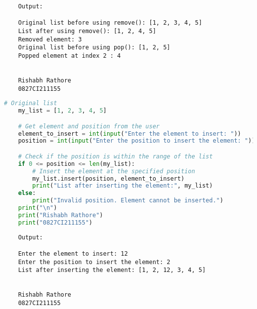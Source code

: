 \documentclass{report}
\begin{document}
\begin{verbatim}
	Output:

	Original list before using remove(): [1, 2, 3, 4, 5]
	List after using remove(): [1, 2, 4, 5]
	Removed element: 3
	Original list before using pop(): [1, 2, 5]
	Popped element at index 2 : 4
	
	
	Rishabh Rathore
	0827CI211155
\end{verbatim}
\newpage


\sol{}
\begin{lstlisting}[language=Python]
	# Original list
	my_list = [1, 2, 3, 4, 5]

	# Get element and position from the user
	element_to_insert = int(input("Enter the element to insert: "))
	position = int(input("Enter the position to insert the element: "))

	# Check if the position is within the range of the list
	if 0 <= position <= len(my_list):
		# Insert the element at the specified position
		my_list.insert(position, element_to_insert)
		print("List after inserting the element:", my_list)
	else:
		print("Invalid position. Element cannot be inserted.")
	print("\n")
	print("Rishabh Rathore")
	print("0827CI211155")
\end{lstlisting}

\begin{verbatim}
	Output:

	Enter the element to insert: 12
	Enter the position to insert the element: 2
	List after inserting the element: [1, 2, 12, 3, 4, 5]
	
	
	Rishabh Rathore
	0827CI211155
\end{verbatim}
\newpage
\end{document}
